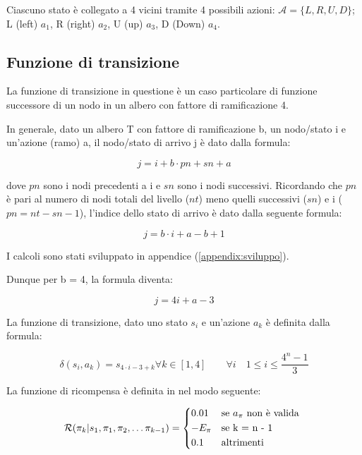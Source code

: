 \documentclass[conference]{IEEEtran}
\begin{document}
Ciascuno stato è collegato a 4 vicini tramite 4 possibili azioni: $\mathcal{A} = \{ L, R, U, D\}$; L (left) $a_1$, R (right) $a_2$, U (up) $a_3$, D (Down) $a_4$.

\subsection{Funzione di transizione}

La funzione di transizione in questione è un caso particolare di funzione successore di un nodo in un albero con fattore di ramificazione 4.

In generale, dato un albero T con fattore di ramificazione b, un nodo/stato i e un'azione (ramo) a, il nodo/stato di arrivo j è dato dalla formula:

\begin{equation}
j = i + b \cdot pn + sn + a
\end{equation}

dove $pn$ sono i nodi precedenti a i e $sn$ sono i nodi successivi. Ricordando che $pn$ è pari al numero di nodi totali del livello ($nt$) meno quelli successivi ($sn$) e i ($pn = nt - sn - 1$), l'indice dello stato di arrivo è dato dalla seguente formula:

\begin{equation}
j = b \cdot i + a - b + 1
\end{equation}

I calcoli sono stati sviluppato in appendice (\ref{appendix:sviluppo}).

Dunque per b = 4, la formula diventa:

\begin{equation}
\label{eq:trans}
\tag{Funzione di transizione}
j = 4i + a - 3
\end{equation}

La funzione di transizione, dato uno stato $s_i$ e un'azione $a_k$ è definita dalla formula:

\begin{equation}
\delta(s_i, a_k) = s_{4 \cdot i - 3 + k} \forall k \in [1,4] \qquad \forall i \quad 1 \leq i \leq \frac{4^n - 1}{3}
\end{equation}

La funzione di ricompensa è definita in \cite{CzibulaPFP} nel modo seguente:

\begin{equation}
    \label{eq:rew}
    \mathcal{R}(\pi_k| s_1, \pi_1, \pi_2, \dots \pi_{k-1}) =
    \begin{cases*}
      0.01 & se $a_{\pi}$ non è valida \\
      - E_{\pi} & se k = n - 1 \\
      0.1 & altrimenti
    \end{cases*}
\end{equation}
\end{document}
